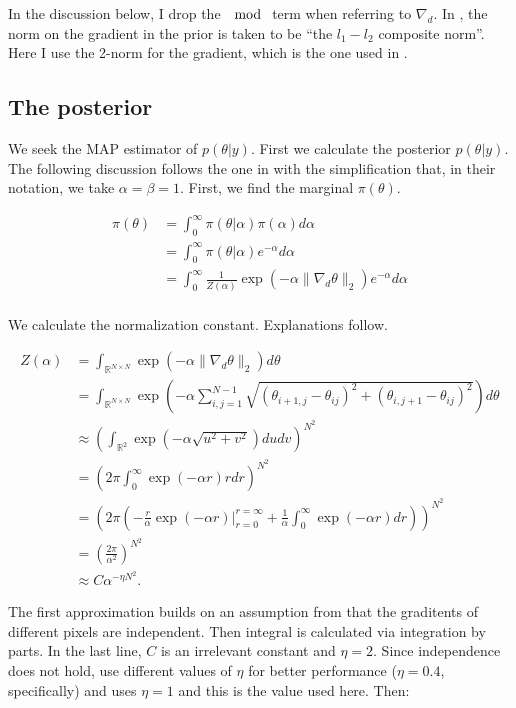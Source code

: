 \documentclass[paper=a4, fontsize=11pt]{scrartcl} %
\numberwithin{equation}{section} %
\numberwithin{figure}{section} %
\numberwithin{table}{section} %
\newcommand{\grad}{\nabla_{d} }
\begin{document}
In the discussion below, I drop the $\mod$ term when referring to
$\grad$. In \cite{green2015bayesian}, the norm on the gradient in the
prior is taken to be ``the $l_1-l_2$ composite norm''. Here I use the
2-norm for the gradient, which is the one used in
\cite{chambolle2004algorithm, oliveira2009adaptive}.

\subsection{The posterior}
We seek the MAP estimator of $p( \theta | y )$. First we calculate the
posterior $p( \theta | y )$.  The following discussion follows the one
in \cite[section 4.1]{oliveira2009adaptive} with the simplification
that, in their notation, we take $\alpha = \beta = 1$. First, we find
the marginal $\pi( \theta )$.

\begin{align*}
  \pi (\theta) &= \int_{0}^{\infty}  \pi(\theta| \alpha ) \pi(\alpha) d\alpha\\
  &= \int_{0}^{\infty}  \pi(\theta| \alpha ) e^{-\alpha} d\alpha \\
  &= \int_{0}^{\infty}  \frac{1}{Z(\alpha)} \exp( -\alpha \|\grad\theta\|_2 ) e^{-\alpha} d\alpha \\
\end{align*}

We calculate the normalization constant. Explanations follow.

\begin{align*}
  Z(\alpha) &= \int_{\mathbb{R}^{N \times N}} \exp( -\alpha \|\grad\theta\|_2 ) d\theta  \\
  &= \int_{\mathbb{R}^{N \times N}} \exp( -\alpha \sum_{i,j=1}^{N-1} \sqrt{ (\theta_{i+1,j} -\theta_{ij})^2 + (\theta_{i,j+1} -\theta_{ij})^2} ) d\theta \\
  &\approx \left (\int_{\mathbb{R}^2}  \exp( -\alpha \sqrt{u^2 + v^2} )dudv \right )^{N^2} \\
  &= \left ( 2\pi \int_0^{\infty} \exp(-\alpha r) rdr \right )^{N^2} \\
  &= \left (2\pi \left (-\frac{r}{\alpha}\exp(-\alpha r) \big
  |_{r=0}^{r=\infty} +\frac{1}{\alpha} \int_0^{\infty}\exp(-\alpha
  r) dr \right ) \right)^{N^2}\\
  &= (\frac{2\pi}{\alpha^2})^{N^2} \\
  & \approx C \alpha^{-\eta N^2}.
\end{align*} 

The first approximation builds on an assumption from
\cite{oliveira2009adaptive} that the graditents of different pixels
are independent. Then integral is calculated via integration by
parts. In the last line, $C$ is an irrelevant constant and $\eta =
2$. Since independence does not hold, \cite{oliveira2009adaptive} use
different values of $\eta$ for better performance ($\eta= 0.4$,
specifically) and \cite{green2015bayesian} uses $\eta = 1$ and this is
the value used here. Then:
\end{document}
